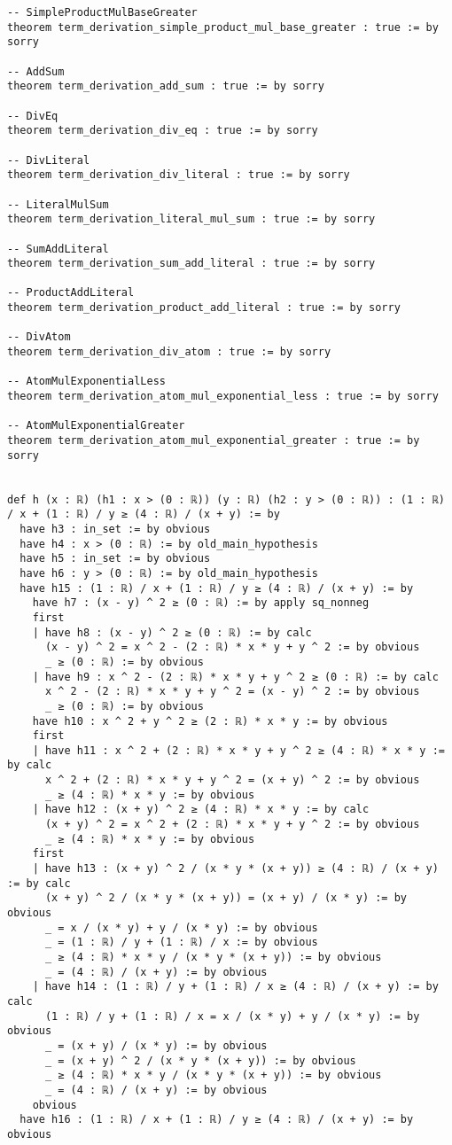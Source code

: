 \documentclass{article}
\begin{document}
\begin{tcolorbox}[colback=white!10, width=\linewidth]
\begin{lstlisting}[language=Lean4]
-- SimpleProductMulBaseGreater
theorem term_derivation_simple_product_mul_base_greater : true := by sorry

-- AddSum
theorem term_derivation_add_sum : true := by sorry

-- DivEq
theorem term_derivation_div_eq : true := by sorry

-- DivLiteral
theorem term_derivation_div_literal : true := by sorry

-- LiteralMulSum
theorem term_derivation_literal_mul_sum : true := by sorry

-- SumAddLiteral
theorem term_derivation_sum_add_literal : true := by sorry

-- ProductAddLiteral
theorem term_derivation_product_add_literal : true := by sorry

-- DivAtom
theorem term_derivation_div_atom : true := by sorry

-- AtomMulExponentialLess
theorem term_derivation_atom_mul_exponential_less : true := by sorry

-- AtomMulExponentialGreater
theorem term_derivation_atom_mul_exponential_greater : true := by sorry


def h (x : ℝ) (h1 : x > (0 : ℝ)) (y : ℝ) (h2 : y > (0 : ℝ)) : (1 : ℝ) / x + (1 : ℝ) / y ≥ (4 : ℝ) / (x + y) := by
  have h3 : in_set := by obvious
  have h4 : x > (0 : ℝ) := by old_main_hypothesis
  have h5 : in_set := by obvious
  have h6 : y > (0 : ℝ) := by old_main_hypothesis
  have h15 : (1 : ℝ) / x + (1 : ℝ) / y ≥ (4 : ℝ) / (x + y) := by
    have h7 : (x - y) ^ 2 ≥ (0 : ℝ) := by apply sq_nonneg
    first
    | have h8 : (x - y) ^ 2 ≥ (0 : ℝ) := by calc
      (x - y) ^ 2 = x ^ 2 - (2 : ℝ) * x * y + y ^ 2 := by obvious
      _ ≥ (0 : ℝ) := by obvious
    | have h9 : x ^ 2 - (2 : ℝ) * x * y + y ^ 2 ≥ (0 : ℝ) := by calc
      x ^ 2 - (2 : ℝ) * x * y + y ^ 2 = (x - y) ^ 2 := by obvious
      _ ≥ (0 : ℝ) := by obvious
    have h10 : x ^ 2 + y ^ 2 ≥ (2 : ℝ) * x * y := by obvious
    first
    | have h11 : x ^ 2 + (2 : ℝ) * x * y + y ^ 2 ≥ (4 : ℝ) * x * y := by calc
      x ^ 2 + (2 : ℝ) * x * y + y ^ 2 = (x + y) ^ 2 := by obvious
      _ ≥ (4 : ℝ) * x * y := by obvious
    | have h12 : (x + y) ^ 2 ≥ (4 : ℝ) * x * y := by calc
      (x + y) ^ 2 = x ^ 2 + (2 : ℝ) * x * y + y ^ 2 := by obvious
      _ ≥ (4 : ℝ) * x * y := by obvious
    first
    | have h13 : (x + y) ^ 2 / (x * y * (x + y)) ≥ (4 : ℝ) / (x + y) := by calc
      (x + y) ^ 2 / (x * y * (x + y)) = (x + y) / (x * y) := by obvious
      _ = x / (x * y) + y / (x * y) := by obvious
      _ = (1 : ℝ) / y + (1 : ℝ) / x := by obvious
      _ ≥ (4 : ℝ) * x * y / (x * y * (x + y)) := by obvious
      _ = (4 : ℝ) / (x + y) := by obvious
    | have h14 : (1 : ℝ) / y + (1 : ℝ) / x ≥ (4 : ℝ) / (x + y) := by calc
      (1 : ℝ) / y + (1 : ℝ) / x = x / (x * y) + y / (x * y) := by obvious
      _ = (x + y) / (x * y) := by obvious
      _ = (x + y) ^ 2 / (x * y * (x + y)) := by obvious
      _ ≥ (4 : ℝ) * x * y / (x * y * (x + y)) := by obvious
      _ = (4 : ℝ) / (x + y) := by obvious
    obvious
  have h16 : (1 : ℝ) / x + (1 : ℝ) / y ≥ (4 : ℝ) / (x + y) := by obvious


\end{lstlisting}
\end{tcolorbox}
\end{document}
